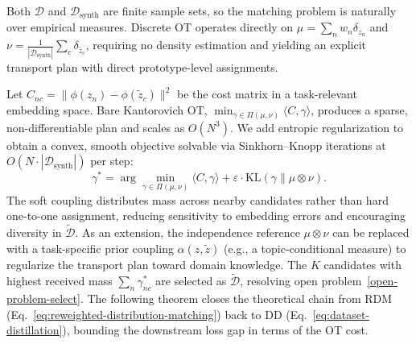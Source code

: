 \documentclass[12pt, a4paper, twoside]{book}
\numberwithin{equation}{chapter}
\theoremstyle{plain}
\theoremstyle{definition}
\theoremstyle{remark}
\newenvironment{foldable}{}{}
\newcommand*{\eg}{e.g.}
\begin{document}
\begin{foldable} Both $\mathcal{D}$ and $\mathcal{D}_\text{synth}$ are finite sample sets, so the matching problem is naturally over empirical measures.
  Discrete \ac{OT} operates directly on $\mu = \sum_n w_n \delta_{z_n}$ and $\nu = \frac{1}{|\mathcal{D}_\text{synth}|}\sum_c \delta_{\tilde{z}_c}$, requiring no density estimation and yielding an explicit transport plan with direct prototype-level assignments.
\end{foldable}

\begin{foldable} Let $C_{nc} = \|\phi(z_n) - \phi(\tilde{z}_c)\|^2$ be the cost matrix in a task-relevant embedding space.
  Bare Kantorovich \ac{OT}, $\min_{\gamma \in \Pi(\mu,\nu)} \langle C, \gamma \rangle$, produces a sparse, non-differentiable plan and scales as $O(N^3)$.
  We add entropic regularization to obtain a convex, smooth objective solvable via Sinkhorn--Knopp iterations at $O(N \cdot |\mathcal{D}_\text{synth}|)$ per step:
  \begin{equation}
    \gamma^* = \arg\min_{\gamma \in \Pi(\mu,\nu)} \langle C, \gamma \rangle + \varepsilon \cdot \text{KL}(\gamma \| \mu \otimes \nu).
    \label{eq:ot}
  \end{equation}
  The soft coupling distributes mass across nearby candidates rather than hard one-to-one assignment, reducing sensitivity to embedding errors and encouraging diversity in $\tilde{\mathcal{D}}$.
  As an extension, the independence reference $\mu \otimes \nu$ can be replaced with a task-specific prior coupling $\alpha(z, \tilde{z})$ (\eg, a topic-conditional measure) to regularize the transport plan toward domain knowledge.
  The $K$ candidates with highest received mass $\sum_n \gamma^*_{nc}$ are selected as $\tilde{\mathcal{D}}$, resolving open problem~\ref{open-problem-select}.
  The following theorem closes the theoretical chain from \ac{RDM} (Eq.~\ref{eq:reweighted-distribution-matching}) back to \ac{DD} (Eq.~\ref{eq:dataset-distillation}), bounding the downstream loss gap in terms of the \ac{OT} cost.


\end{foldable}
\end{document}
